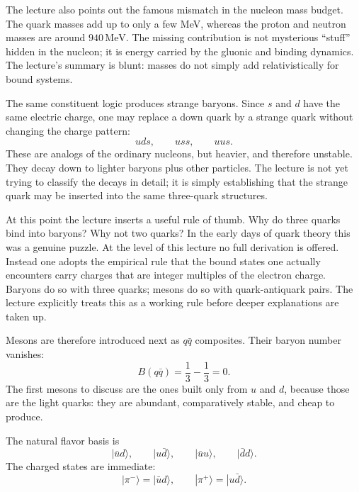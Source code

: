 \begin{remark}
The lecture also points out the famous mismatch in the nucleon mass budget. The quark masses add up to only a few MeV, whereas the proton and neutron masses are around \(940\,\mathrm{MeV}\). The missing contribution is not mysterious ``stuff'' hidden in the nucleon; it is energy carried by the gluonic and binding dynamics. The lecture's summary is blunt: masses do not simply add relativistically for bound systems.
\end{remark}

The same constituent logic produces strange baryons. Since \(s\) and \(d\) have the same electric charge, one may replace a down quark by a strange quark without changing the charge pattern:
\begin{equation}
uds,\qquad uss,\qquad uus.
\end{equation}
These are analogs of the ordinary nucleons, but heavier, and therefore unstable. They decay down to lighter baryons plus other particles. The lecture is not yet trying to classify the decays in detail; it is simply establishing that the strange quark may be inserted into the same three-quark structures.

At this point the lecture inserts a useful rule of thumb. Why do three quarks bind into baryons? Why not two quarks? In the early days of quark theory this was a genuine puzzle. At the level of this lecture no full derivation is offered. Instead one adopts the empirical rule that the bound states one actually encounters carry charges that are integer multiples of the electron charge. Baryons do so with three quarks; mesons do so with quark-antiquark pairs. The lecture explicitly treats this as a working rule before deeper explanations are taken up.

Mesons are therefore introduced next as \(q\bar q\) composites. Their baryon number vanishes:
\begin{equation}
B(q\bar q)=\frac13-\frac13=0.
\end{equation}
The first mesons to discuss are the ones built only from \(u\) and \(d\), because those are the light quarks: they are abundant, comparatively stable, and cheap to produce.

The natural flavor basis is
\begin{equation}
|\bar u d\rangle,\qquad |u\bar d\rangle,\qquad |\bar u u\rangle,\qquad |\bar d d\rangle.
\end{equation}
The charged states are immediate:
\begin{equation}
|\pi^-\rangle=|\bar u d\rangle,
\qquad
|\pi^+\rangle=|u\bar d\rangle.
\end{equation}

